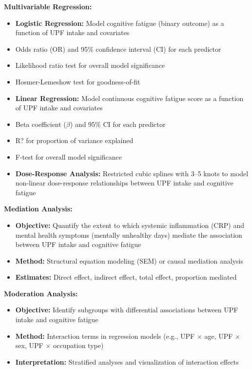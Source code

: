 \documentclass[journal,twoside,10pt]{IEEEtran}
\begin{document}
\textbf{Multivariable Regression:}
\begin{itemize}
\item \textbf{Logistic Regression:} Model cognitive fatigue (binary outcome) as a function of UPF intake and covariates
\item Odds ratio (OR) and 95\% confidence interval (CI) for each predictor
\item Likelihood ratio test for overall model significance
\item Hosmer-Lemeshow test for goodness-of-fit
\item \textbf{Linear Regression:} Model continuous cognitive fatigue score as a function of UPF intake and covariates
\item Beta coefficient ($\beta$) and 95\% CI for each predictor
\item R? for proportion of variance explained
\item F-test for overall model significance
\item \textbf{Dose-Response Analysis:} Restricted cubic splines with 3--5 knots to model non-linear dose-response relationships between UPF intake and cognitive fatigue
\end{itemize}

\textbf{Mediation Analysis:}
\begin{itemize}
\item \textbf{Objective:} Quantify the extent to which systemic inflammation (CRP) and mental health symptoms (mentally unhealthy days) mediate the association between UPF intake and cognitive fatigue
\item \textbf{Method:} Structural equation modeling (SEM) or causal mediation analysis
\item \textbf{Estimates:} Direct effect, indirect effect, total effect, proportion mediated
\end{itemize}

\textbf{Moderation Analysis:}
\begin{itemize}
\item \textbf{Objective:} Identify subgroups with differential associations between UPF intake and cognitive fatigue
\item \textbf{Method:} Interaction terms in regression models (e.g., UPF $\times$ age, UPF $\times$ sex, UPF $\times$ occupation type)
\item \textbf{Interpretation:} Stratified analyses and visualization of interaction effects
\end{itemize}
\end{document}
